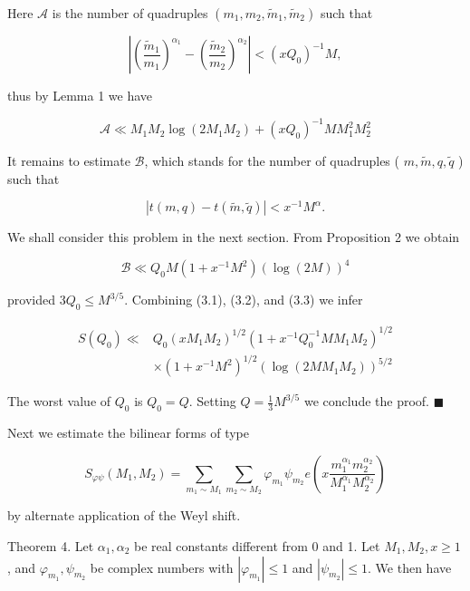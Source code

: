 \documentclass[10pt]{article}
\begin{document}
Here $\mathscr{A}$ is the number of quadruples $\left(m_{1}, m_{2}, \tilde{m}_{1}, \tilde{m}_{2}\right)$ such that

$$
\left|\left(\frac{\tilde{m}_{1}}{m_{1}}\right)^{\alpha_{1}}-\left(\frac{\tilde{m}_{2}}{m_{2}}\right)^{\alpha_{2}}\right|<\left(x Q_{0}\right)^{-1} M,
$$

thus by Lemma 1 we have


\begin{equation*}
\mathscr{A} \ll M_{1} M_{2} \log\left(2 M_{1} M_{2}\right)+\left(x Q_{0}\right)^{-1} M M_{1}^{2} M_{2}^{2} \tag{3.2}
\end{equation*}


It remains to estimate $\mathscr{B}$, which stands for the number of quadruples ( $m, \tilde{m}, q, \tilde{q}$ ) such that

$$
|t(m, q)-t(\tilde{m}, \tilde{q})|<x^{-1} M^{\alpha} .
$$

We shall consider this problem in the next section. From Proposition 2 we obtain


\begin{equation*}
\mathscr{B} \ll Q_{0} M\left(1+x^{-1} M^{2}\right)(\log(2 M))^{4} \tag{3.3}
\end{equation*}


provided $3 Q_{0} \leqslant M^{3 / 5}$. Combining (3.1), (3.2), and (3.3) we infer

$$
\begin{aligned}
S\left(Q_{0}\right) \ll & Q_{0}\left(x M_{1} M_{2}\right)^{1 / 2}\left(1+x^{-1} Q_{0}^{-1} M M_{1} M_{2}\right)^{1 / 2} \\
& \times\left(1+x^{-1} M^{2}\right)^{1 / 2}\left(\log\left(2 M M_{1} M_{2}\right)\right)^{5 / 2}
\end{aligned}
$$

The worst value of $Q_{0}$ is $Q_{0}=Q$. Setting $Q=\frac{1}{3} M^{3 / 5}$ we conclude the proof. \(\blacksquare\)

Next we estimate the bilinear forms of type

$$
S_{\varphi \psi}\left(M_{1}, M_{2}\right)=\sum_{m_{1} \sim M_{1}} \sum_{m_{2} \sim M_{2}} \varphi_{m_{1}} \psi_{m_{2}} e\left(x \frac{m_{1}^{\alpha_{1}} m_{2}^{\alpha_{2}}}{M_{1}^{\alpha_{1}} M_{2}^{\alpha_{2}}}\right)
$$

by alternate application of the Weyl shift.

Theorem 4. Let $\alpha_{1}, \alpha_{2}$ be real constants different from 0 and 1. Let $M_{1}, M_{2}, x \geqslant 1$, and $\varphi_{m_{1}}, \psi_{m_{2}}$ be complex numbers with $\left|\varphi_{m_{1}}\right| \leqslant 1$ and $\left|\psi_{m_{2}}\right| \leqslant 1$. We then have
\end{document}
